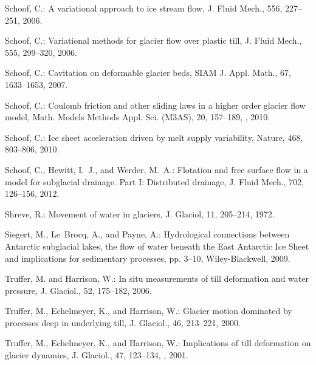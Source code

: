 \documentclass[gmd]{copernicus}   %
\begin{document}
\begin{thebibliography}{67}
Schoof, C.: A variational approach to ice stream flow, J. Fluid Mech., 556,
  227--251, 2006{}.

Schoof, C.: Variational methods for glacier flow over plastic till, J. Fluid
  Mech., 555, 299--320, 2006{}.

Schoof, C.: Cavitation on deformable glacier beds, SIAM J. Appl. Math., 67,
  1633--1653, 2007.

Schoof, C.: Coulomb friction and other sliding laws in a higher order glacier
  flow model, Math. Models Methods Appl. Sci. (M3AS), 20, 157--189,
  , 2010{}.

Schoof, C.: Ice sheet acceleration driven by melt supply variability, Nature,
  468, 803--806, 2010{}.

Schoof, C., Hewitt, I.~J., and Werder, M.~A.: Flotation and free surface flow
  in a model for subglacial drainage. {P}art {I}: {D}istributed drainage, J.
  Fluid Mech., 702, 126--156, 2012.

Shreve, R.: Movement of water in glaciers, J. Glaciol, 11, 205--214, 1972.

Siegert, M., Le~Brocq, A., and Payne, A.: Hydrological connections between
  Antarctic subglacial lakes, the flow of water beneath the East Antarctic Ice
  Sheet and implications for sedimentary processes, pp. 3--10, Wiley-Blackwell,
  2009.

Truffer, M. and Harrison, W.: In situ measurements of till deformation and
  water pressure, J. Glaciol., 52, 175--182, 2006.

Truffer, M., Echelmeyer, K., and Harrison, W.: Glacier motion dominated by
  processes deep in underlying till, J. Glaciol., 46, 213--221, 2000.

Truffer, M., Echelmeyer, K., and Harrison, W.: Implications of till deformation
  on glacier dynamics, J. Glaciol., 47, 123--134,
  , 2001.


\end{thebibliography}
\end{document}
